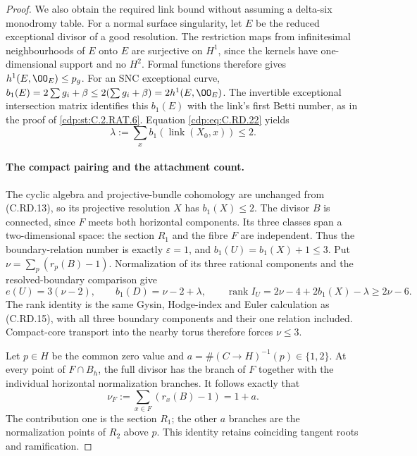 \begin{proof}
We also obtain the required link bound without
assuming a delta-six monodromy table. For a
normal surface singularity, let $E$ be the
reduced exceptional divisor of a good resolution.
The restriction maps from infinitesimal
neighbourhoods of $E$ onto $E$ are surjective
on $H^1$, since the kernels have one-dimensional
support and no $H^2$. Formal functions therefore
gives $h^1(E,\OO_E)\le p_g$.
For an SNC exceptional curve,
$b_1(E)=2\sum g_i+\beta\le
2(\sum g_i+\beta)=2h^1(E,\OO_E)$.
The invertible exceptional intersection matrix
identifies this $b_1(E)$ with the link's first
Betti number, as in the proof of \ref{cdp:st:C.2.RAT.6}.
Equation \eqref{cdp:eq:C.RD.22} yields
\[
              \lambda:=\sum_x b_1(\operatorname{link}(X_0,x))
                            \le2.
\tag{C.RD.23}\label{cdp:eq:C.RD.23}
\]

\paragraph{The compact pairing and the attachment count.}
The cyclic algebra and projective-bundle cohomology
are unchanged from (C.RD.13), so its projective
resolution $X$ has $b_1(X)\le2$.
The divisor $B$ is connected, since $F$ meets
both horizontal components. Its three classes
span a two-dimensional space: the section
$R_1$ and the fibre $F$ are independent.
Thus the boundary-relation number is exactly
$\varepsilon=1$, and $b_1(U)=b_1(X)+1\le3$.
Put $\nu=\sum_p(r_p(B)-1)$.
Normalization of its three rational components
and the resolved-boundary comparison give
\[
 e(U)=3(\nu-2),\qquad
 b_1(D)=\nu-2+\lambda,
 \qquad
 \operatorname{rank}I_U
       =2\nu-4+2b_1(X)-\lambda\ge2\nu-6.
\tag{C.RD.24}\label{cdp:eq:C.RD.24}
\]
The rank identity is the same Gysin, Hodge-index
and Euler calculation as (C.RD.15), with all
three boundary components and their one relation
included. Compact-core transport into the
nearby torus therefore forces $\nu\le3$.

Let $p\in H$ be the common zero value and
$a=\#(C\to H)^{-1}(p)\in\{1,2\}$.
At every point of $F\cap B_h$, the full divisor
has the branch of $F$ together with the
individual horizontal normalization branches.
It follows exactly that
\[
        \nu_F:=\sum_{x\in F}(r_x(B)-1)=1+a.
\tag{C.RD.25}\label{cdp:eq:C.RD.25}
\]
The contribution one is the section $R_1$;
the other $a$ branches are the normalization
points of $R_2$ above $p$. This identity retains
coinciding tangent roots and ramification.


\end{proof}
